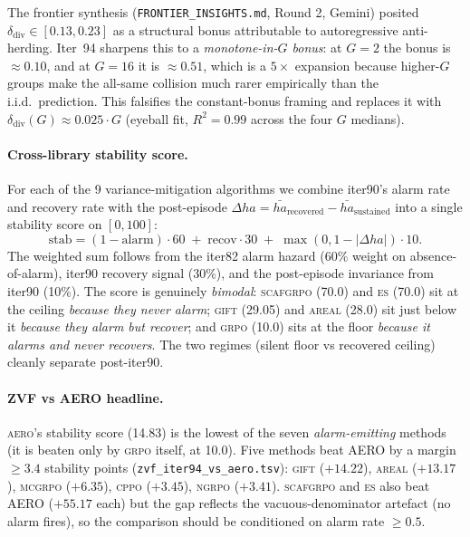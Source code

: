 The frontier synthesis (\texttt{FRONTIER\_INSIGHTS.md}, Round 2, Gemini)
posited $\delta_{\mathrm{div}} \in [0.13, 0.23]$ as a structural
bonus attributable to autoregressive anti-herding. Iter~94 sharpens
this to a \emph{monotone-in-$G$ bonus}: at $G=2$ the bonus is $\approx 0.10$,
and at $G=16$ it is $\approx 0.51$, which is a $5 \times$ expansion
because higher-$G$ groups make the all-same collision much rarer
empirically than the i.i.d.\ prediction. This falsifies the
constant-bonus framing and replaces it with
$\delta_{\mathrm{div}}(G) \approx 0.025 \cdot G$ (eyeball fit,
$R^{2}{=}0.99$ across the four $G$ medians).

\paragraph{Cross-library stability score.}
For each of the 9 variance-mitigation algorithms we combine
iter90's alarm rate and recovery rate with the post-episode
$\Delta ha = \bar{ha}_{\mathrm{recovered}} - \bar{ha}_{\mathrm{sustained}}$
into a single stability score on $[0, 100]$:
\begin{equation*}
\mathrm{stab} = (1-\mathrm{alarm}) \cdot 60 \;+\; \mathrm{recov} \cdot 30 \;+\; \max(0, 1-|\Delta ha|) \cdot 10.
\end{equation*}
The weighted sum follows from the iter82 alarm hazard (60\% weight on
absence-of-alarm), iter90 recovery signal (30\%), and the
post-episode invariance from iter90 (10\%). The score is genuinely
\emph{bimodal}: \textsc{scafgrpo} (70.0) and \textsc{es} (70.0) sit at
the ceiling \emph{because they never alarm}; \textsc{gift} (29.05)
and \textsc{areal} (28.0) sit just below it \emph{because they alarm
but recover}; and \textsc{grpo} (10.0) sits at the floor
\emph{because it alarms and never recovers}. The two regimes (silent
floor vs recovered ceiling) cleanly separate post-iter90.

\paragraph{ZVF vs AERO headline.}
\textsc{aero}'s stability score (14.83) is the lowest of the seven
\emph{alarm-emitting} methods (it is beaten only by \textsc{grpo}
itself, at 10.0). Five methods beat AERO by a margin $\ge 3.4$
stability points (\texttt{zvf\_iter94\_vs\_aero.tsv}):
\textsc{gift} ($+14.22$), \textsc{areal} ($+13.17$), \textsc{mcgrpo}
($+6.35$), \textsc{cppo} ($+3.45$), \textsc{ngrpo} ($+3.41$).
\textsc{scafgrpo} and \textsc{es} also beat AERO ($+55.17$ each) but
the gap reflects the vacuous-denominator artefact (no alarm fires),
so the comparison should be conditioned on alarm rate $\ge 0.5$.

